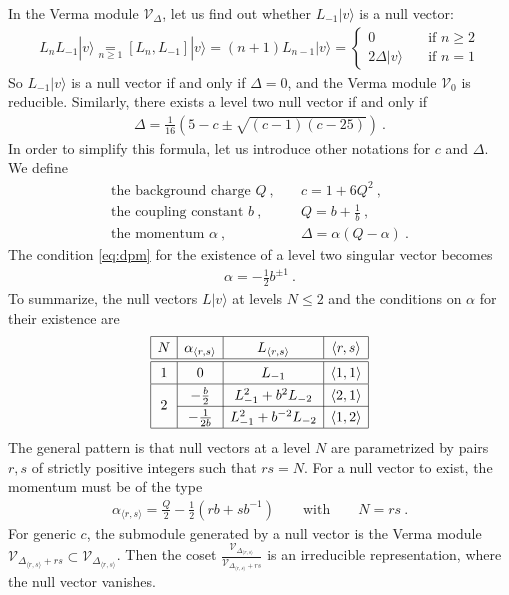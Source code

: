 \documentclass[12pt, a4paper]{article}
\theoremstyle{break}
\begin{document}
In the Verma module $\mathcal V_\Delta$, let us find out whether $L_{-1}|v\rangle$ is a null vector:
\begin{align}
L_n L_{-1}|v\rangle \underset{n\geq 1}{=} [L_n, L_{-1}] |v\rangle = (n+1) L_{n-1}|v\rangle = 
\left\{\begin{array}{ll} 0 &  \quad \text{if } n\geq 2 \\ 2\Delta |v\rangle & \quad \text{if } n = 1 \end{array}\right. 
\end{align}
So $L_{-1}|v\rangle$ is a null vector if and only if $\Delta=0$, and the Verma module $\mathcal V_0$ is reducible.
Similarly, there exists a level two null vector if and only if 
 \begin{align}
 \Delta = \frac{1}{16}\left( 5-c\pm\sqrt{(c-1)(c-25)} \right) \ .
 \label{eq:dpm}
\end{align}
In order to simplify this formula, let us introduce other notations for $c$ and $\Delta$. We define
\begin{align}
 \text{the background charge } Q \ , & \quad c = 1+6Q^2\ , 
 \\
 \text{the coupling constant } b \ , & \quad Q = b+\frac{1}{b} \ ,
 \\
 \text{the momentum } \alpha\  , &\quad \Delta = \alpha(Q-\alpha)\ .
\end{align}
The condition \eqref{eq:dpm} for the existence of a level two singular vector becomes 
\begin{align}
 \alpha = -\frac12 b^{\pm 1}\ .
\end{align}
To summarize, the null vectors $L|v\rangle$ at levels $N\leq 2$ and the conditions on $\alpha$ for their existence are 
\begin{align}
\renewcommand{\arraystretch}{1.3}
\begin{array}{|c|c|c|c|}
\hline 
N   & \alpha_{\langle r,s\rangle} & L_{\langle r,s\rangle} & \langle r,s\rangle
\\
\hline\hline
1  &  0 & L_{-1} & \langle 1,1\rangle
\\
\hline
\multirow{2}{*}{2}  &  -\frac{b}{2} & L_{-1}^2 + b^2 L_{-2} & 
\langle 2,1\rangle
\\
\cline{2-4}
&   -\frac{1}{2b} & L_{-1}^2 + b^{-2} L_{-2} & \langle 1,2\rangle 
\\
\hline
\end{array}
\label{lot}
\end{align}
The general pattern is that null vectors at a level $N$ are parametrized by pairs $r,s$ of strictly positive integers such that $rs=N$. 
For a null vector to exist, the momentum must be of the type
\begin{align}
  \alpha_{\langle r,s\rangle} = \frac{Q}{2} - \frac12(rb+sb^{-1})\qquad \text{with} \qquad N=rs\ .
  \label{eq:ars}
 \end{align}
 For generic $c$, the submodule generated by a null vector is the Verma module $\mathcal V_{\Delta_{\langle r,s\rangle} +rs}\subset \mathcal V_{\Delta_{\langle r,s\rangle}}$. Then the coset $\frac{ \mathcal V_{\Delta_{\langle r,s\rangle}} }{ \mathcal V_{\Delta_{\langle r,s\rangle} +rs} }$ is an irreducible representation, where the null vector vanishes.
\end{document}
